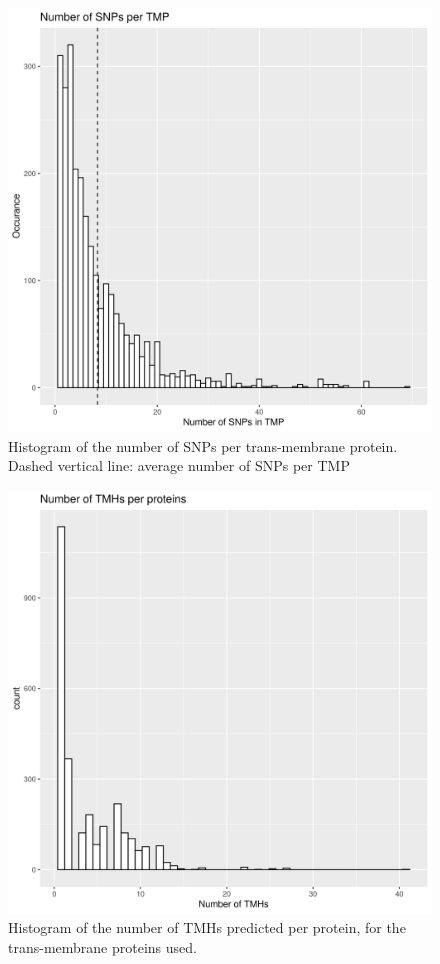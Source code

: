 \begin{figure}[!htbp]
  \includegraphics[width=\textwidth]{ncbi_peregrine_results/fig_n_snps_per_tmp.png}
  \caption{
    Histogram of the number of SNPs per trans-membrane protein.
    Dashed vertical line: average number of SNPs per TMP
  }
  \label{fig:fig_n_snps_per_tmp}
\end{figure}

\begin{figure}[!htbp]
  \includegraphics[width=\textwidth]{ncbi_peregrine_results/fig_n_tmhs_per_protein.png}
  \caption{
    Histogram of the number of TMHs predicted per protein,
    for the trans-membrane proteins used.
  }
  \label{fig:fig_n_tmhs_per_protein}
\end{figure}

